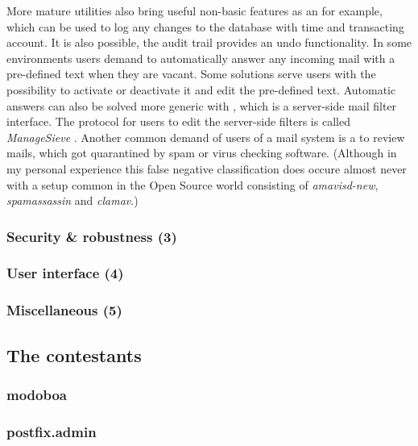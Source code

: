 \documentclass[12pt,a4paper]{scrartcl}
\begin{document}
				More mature utilities also bring useful non-basic features as
				an  for example, which can be used to
				log any changes to the database with time and transacting
				account. It is also possible, the audit trail provides an undo
				functionality. In some environments users demand  to automatically answer any incoming mail with
				a pre-defined text when they are vacant. Some solutions serve
				users with the possibility to activate or deactivate it and
				edit the pre-defined text. Automatic answers can also be solved
				more generic with  \cite{sieve}, which is a
				server-side mail filter interface. The protocol for users to
				edit the server-side filters is called \emph{ManageSieve}
				\cite{managesieve}. Another common demand of users of a mail
				system is a  to review mails, which
				got quarantined by spam or virus checking software. (Although in
				my personal experience this false negative classification does
				occure almost never with a setup common in the Open Source
				world consisting of \emph{amavisd-new}, \emph{spamassassin} and
				\emph{clamav}.)

			\subsubsection*{Security \& robustness (3)}

			\subsubsection*{User interface (4)}

			\subsubsection*{Miscellaneous (5)}

		\subsection*{The contestants}
			\subsubsection*{modoboa}

			\label{sec:contestants:postfix.admin}
			\subsubsection*{postfix.admin}
\end{document}
